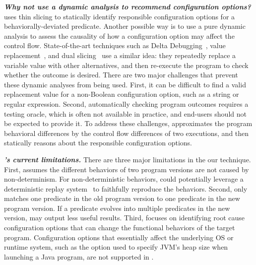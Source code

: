 \vspace{1mm}
\noindent \textbf{\textit{Why not use a dynamic analysis to recommend
configuration options?}}
\ourtool uses thin slicing to statically identify responsible configuration
options for a behaviorally-deviated predicate. Another possible way is to use a pure
dynamic analysis to assess the causality of how a configuration option
may affect the control flow. State-of-the-art
techniques such as Delta Debugging~\cite{dd}, value replacement~\cite{failuredoc},
and dual slicing~\cite{Sumner:2013:CCE}
use a similar idea: they repeatedly replace a variable value with other alternatives,
and then re-execute the program to check whether the outcome is desired.
There are two major challenges that prevent these dynamic analyses
from being used. First, it can be
difficult to find a valid replacement value for a non-Boolean
configuration option, such as a string or regular expression.
Second, automatically checking program outcomes requires
a testing oracle, which is often not available in practice, and end-users
should not be  expected to provide it. To address these challenges,
\ourtool approximates the program behavioral differences by the
control flow differences of two executions, and then statically reasons
about the responsible configuration options.



\vspace{1mm}
\noindent \textbf{\textit{\ourtool's current limitations.}}
There are three major limitations in the our \ourtool technique.
First, \ourtool assumes the different behaviors
of two program versions are not caused by non-determinism.
For non-deterministic behaviors, \ourtool
could potentially leverage a deterministic replay
system~\cite{Huang:2013:CRL, Jin:2012:BRF} to faithfully reproduce the behaviors.
Second, \ourtool only matches one predicate in the old
program version to one predicate in the new program version.
If a predicate evolves into multiple predicates in the new
version, \ourtool may output less useful results. 
Third, \ourtool focuses on identifying root cause
configuration options that can change the functional behaviors of
the target program.
Configuration options that essentially affect the underlying
OS or runtime system, such as the  option used to
specify JVM's heap size when launching a Java program,
are not supported in \ourtool.

